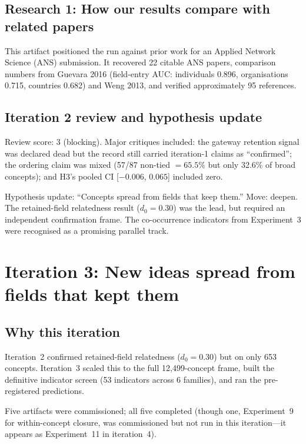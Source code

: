 \documentclass[11pt,letterpaper]{article}
\begin{document}
\subsection{Research 1: How our results compare with related papers}

This artifact positioned the run against prior work for an Applied Network Science (ANS) submission. It recovered 22 citable ANS papers, comparison numbers from Guevara 2016 (field-entry AUC: individuals 0.896, organisations 0.715, countries 0.682) and Weng 2013, and verified approximately 95 references.

\subsection{Iteration 2 review and hypothesis update}

Review score: 3 (blocking). Major critiques included: the gateway retention signal was declared dead but the record still carried iteration-1 claims as ``confirmed''; the ordering claim was mixed (57/87 non-tied $= 65.5\%$ but only 32.6\% of broad concepts); and H3's pooled CI [$-0.006$, $0.065$] included zero.

Hypothesis update: ``Concepts spread from fields that keep them.'' Move: deepen. The retained-field relatedness result ($d_0 = 0.30$) was the lead, but required an independent confirmation frame. The co-occurrence indicators from Experiment~3 were recognised as a promising parallel track.

\section{Iteration 3: New ideas spread from fields that kept them}
\label{sec:iter3}

\subsection{Why this iteration}

Iteration~2 confirmed retained-field relatedness ($d_0 = 0.30$) but on only 653 concepts. Iteration~3 scaled this to the full 12{,}499-concept frame, built the definitive indicator screen (53 indicators across 6 families), and ran the pre-registered predictions.

Five artifacts were commissioned; all five completed (though one, Experiment~9 for within-concept closure, was commissioned but not run in this iteration---it appears as Experiment~11 in iteration~4).
\end{document}
